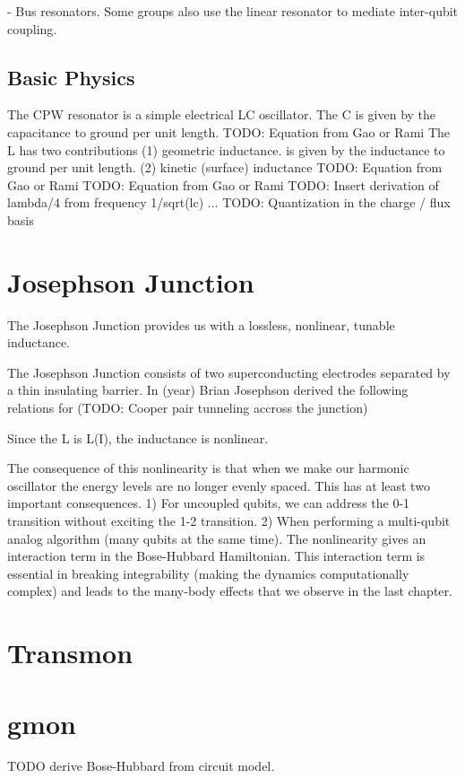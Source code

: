 - Bus resonators.
Some groups also use the linear resonator to mediate inter-qubit coupling.

\subsection{Basic Physics}
The CPW resonator is a simple electrical LC oscillator.
The C is given by the capacitance to ground per unit length.
TODO:  Equation from Gao or Rami
The L has two contributions
(1) geometric inductance.  is given by the inductance to ground per unit length.
(2) kinetic (surface) inductance
TODO:  Equation from Gao or Rami
TODO:  Equation from Gao or Rami
TODO:  Insert derivation of lambda/4 from frequency 1/sqrt(lc) ...
TODO:  Quantization in the charge / flux basis

\section{Josephson Junction}
The Josephson Junction provides us with a lossless, nonlinear, tunable inductance.

The Josephson Junction consists of two superconducting electrodes separated by a thin insulating barrier.
In (year) Brian Josephson derived the following relations for (TODO: Cooper pair tunneling accross the junction)

Since the L is L(I), the inductance is nonlinear.

The consequence of this nonlinearity is that when we make our harmonic oscillator the energy levels are no longer evenly spaced.
This has at least two important consequences.
1) For uncoupled qubits, we can address the 0-1 transition without exciting the 1-2 transition.
2) When performing a multi-qubit analog algorithm (many qubits at the same time).
The nonlinearity gives an interaction term in the Bose-Hubbard Hamiltonian.
This interaction term is essential in breaking integrability (making the dynamics computationally complex) and leads to the many-body effects that we observe in the last chapter.

\section{Transmon}

\section{gmon}
TODO derive Bose-Hubbard from circuit model.

